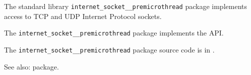 
The standard library {\tt internet\_socket\_\_premicrothread} package implements access to TCP and UDP Internet Protocol sockets.

The {\tt internet\_socket\_\_premicrothread} package implements the  API.

The {\tt internet\_socket\_\_premicrothread} package source code is in .

See also:   package.

